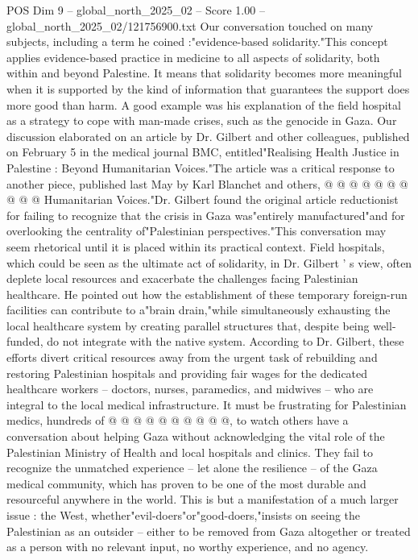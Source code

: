 \begin{textsample}{POS Dim 9 – global\_north\_2025\_02 – Score 1.00 – global\_north\_2025\_02/121756900.txt}
Our conversation touched on many subjects, including a term he coined :"evidence-based solidarity."This concept applies evidence-based practice in medicine to all aspects of solidarity, both within and beyond Palestine.
It means that solidarity becomes more meaningful when it is supported by the kind of information that guarantees the support does more good than harm.
A good example was his explanation of the field hospital as a strategy to cope with man-made crises, such as the genocide in Gaza.
Our discussion elaborated on an article by Dr.
Gilbert and other colleagues, published on February 5 in the medical journal BMC, entitled"Realising Health Justice in Palestine : Beyond Humanitarian Voices."The article was a critical response to another piece, published last May by Karl Blanchet and others, @ @ @ @ @ @ @ @ @ @ Humanitarian Voices."Dr.
Gilbert found the original article reductionist for failing to recognize that the crisis in Gaza was"entirely manufactured"and for overlooking the centrality of"Palestinian perspectives."This conversation may seem rhetorical until it is placed within its practical context.
Field hospitals, which could be seen as the ultimate act of solidarity, in Dr.
Gilbert ' s view, often deplete local resources and exacerbate the challenges facing Palestinian healthcare.
He pointed out how the establishment of these temporary foreign-run facilities can contribute to a"brain drain,"while simultaneously exhausting the local healthcare system by creating parallel structures that, despite being well-funded, do not integrate with the native system.
According to Dr.
Gilbert, these efforts divert critical resources away from the urgent task of rebuilding and restoring Palestinian hospitals and providing fair wages for the dedicated healthcare workers -- doctors, nurses, paramedics, and midwives -- who are integral to the local medical infrastructure.
It must be frustrating for Palestinian medics, hundreds of @ @ @ @ @ @ @ @ @ @, to watch others have a conversation about helping Gaza without acknowledging the vital role of the Palestinian Ministry of Health and local hospitals and clinics.
They fail to recognize the unmatched experience -- let alone the resilience -- of the Gaza medical community, which has proven to be one of the most durable and resourceful anywhere in the world.
This is but a manifestation of a much larger issue : the West, whether"evil-doers"or"good-doers,"insists on seeing the Palestinian as an outsider -- either to be removed from Gaza altogether or treated as a person with no relevant input, no worthy experience, and no agency.

\end{textsample}

